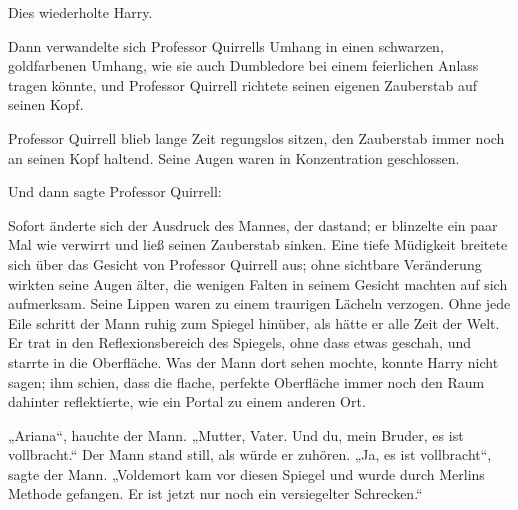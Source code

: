 Dies wiederholte Harry.

Dann verwandelte sich Professor Quirrells Umhang in einen schwarzen, goldfarbenen Umhang, wie sie auch Dumbledore bei einem feierlichen Anlass tragen könnte, und Professor Quirrell richtete seinen eigenen Zauberstab auf seinen Kopf.

Professor Quirrell blieb lange Zeit regungslos sitzen, den Zauberstab immer noch an seinen Kopf haltend. Seine Augen waren in Konzentration geschlossen.

Und dann sagte Professor Quirrell: 

Sofort änderte sich der Ausdruck des Mannes, der dastand; er blinzelte ein paar Mal wie verwirrt und ließ seinen Zauberstab sinken.
Eine tiefe Müdigkeit breitete sich über das Gesicht von Professor Quirrell aus; ohne sichtbare Veränderung wirkten seine Augen älter, die wenigen Falten in seinem Gesicht machten auf sich aufmerksam. Seine Lippen waren zu einem traurigen Lächeln verzogen. Ohne jede Eile schritt der Mann ruhig zum Spiegel hinüber, als hätte er alle Zeit der Welt. Er trat in den Reflexionsbereich des Spiegels, ohne dass etwas geschah, und starrte in die Oberfläche. Was der Mann dort sehen mochte, konnte Harry nicht sagen; ihm schien, dass die flache, perfekte Oberfläche immer noch den Raum dahinter reflektierte, wie ein Portal zu einem anderen Ort.

„Ariana“, hauchte der Mann.
„Mutter, Vater. Und du, mein Bruder, es ist vollbracht.“
Der Mann stand still, als würde er zuhören.
„Ja, es ist vollbracht“, sagte der Mann.
„Voldemort kam vor diesen Spiegel und wurde durch Merlins Methode gefangen. Er ist jetzt nur noch ein versiegelter Schrecken.“

